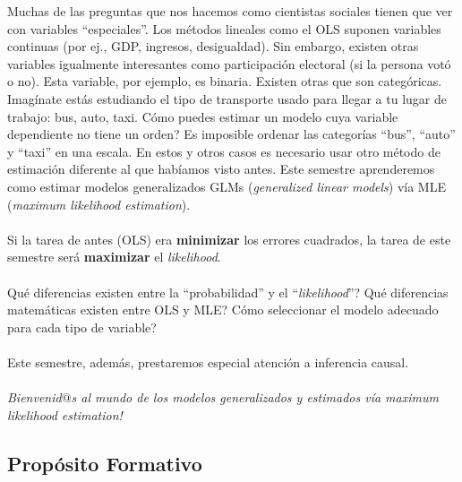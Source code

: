 \documentclass[letterpaper]{article}
\begin{document}
Muchas de las preguntas que nos hacemos como cientistas sociales tienen que ver con variables ``especiales''. Los m\'etodos lineales como el OLS suponen variables continuas (por ej., GDP, ingresos, desigualdad). Sin embargo, existen otras variables igualmente interesantes como participaci\'on electoral (si la persona vot\'o o no). Esta variable, por ejemplo, es binaria. Existen otras que son categ\'oricas. Imag\'inate est\'as estudiando el tipo de transporte usado para llegar a tu lugar de trabajo: bus, auto, taxi. C\'omo puedes estimar un modelo cuya variable dependiente no tiene un orden? Es imposible ordenar las categor\'ias ``bus'', ``auto'' y ``taxi'' en una escala. En estos y otros casos es necesario usar otro m\'etodo de estimaci\'on diferente al que hab\'iamos visto antes. Este semestre aprenderemos como estimar modelos generalizados GLMs (\emph{generalized linear models})  v\'ia MLE (\emph{maximum likelihood estimation}).
\\
\\
Si la tarea de antes (OLS) era {\bf minimizar} los errores cuadrados, la tarea de este semestre ser\'a {\bf maximizar} el \emph{likelihood}.
\\
\\
Qu\'e diferencias existen entre la ``probabilidad'' y el ``\emph{likelihood}''? Qu\'e diferencias matem\'aticas existen entre OLS y MLE? C\'omo seleccionar el modelo adecuado para cada tipo de variable?
\\
\\
Este semestre, adem\'as, prestaremos especial atenci\'on a inferencia causal.
\\
\\
\emph{Bienvenid$@$s al mundo de los modelos generalizados y estimados v\'ia maximum likelihood estimation!}


\subsection*{Prop\'osito Formativo}
\end{document}

